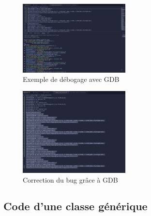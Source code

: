 \begin{multicols}{2}
\begin{figure}[H]
    \centering
    \includegraphics[width=0.5\textwidth]{images/gdb.png}
    \caption{Exemple de débogage avec GDB}
    \label{fig:debug}
\end{figure}

\begin{figure}[H]
    \centering
    \includegraphics[width=0.5\textwidth]{images/gdb_fix.png}
    \caption{Correction du bug grâce à GDB}
    \label{fig:fix}
\end{figure}
\end{multicols}

\subsection{Code d'une classe générique}

